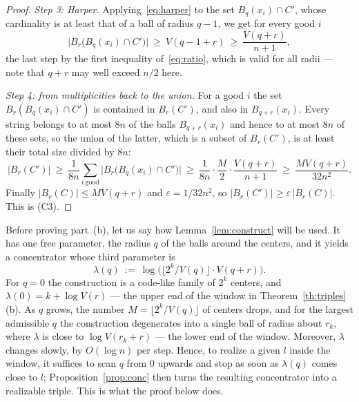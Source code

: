 \documentclass[11pt,a4paper]{article}
\theoremstyle{definition}
\newcommand{\eps}{\varepsilon}
\renewcommand{\le}{\leqslant}
\renewcommand{\ge}{\geqslant}
\begin{document}
\begin{proof}
\emph{Step 3: Harper.} Applying~\eqref{eq:harper} to the set
$B_q(x_i)\cap C'$, whose cardinality is at least that of a ball of radius
$q-1$, we get for every good $i$
\[
  \bigl|B_r\bigl(B_q(x_i)\cap C'\bigr)\bigr|\ \ge\ V(q-1+r)\ \ge\
  \frac{V(q+r)}{n+1},
\]
the last step by the first inequality of~\eqref{eq:ratio}, which is valid for
all radii --- note that $q+r$ may well exceed $n/2$ here.

\emph{Step 4: from multiplicities back to the union.} For a good $i$ the set
$B_r(B_q(x_i)\cap C')$ is contained in $B_r(C')$, and also in $B_{q+r}(x_i)$.
Every string belongs to at most $8n$ of the balls $B_{q+r}(x_i)$ and hence to
at most $8n$ of these sets, so the union of the latter, which is a subset of
$B_r(C')$, is at least their total size divided by $8n$:
\[
  |B_r(C')|\ \ge\ \frac1{8n}\sum_{i\ \text{good}}
  \bigl|B_r\bigl(B_q(x_i)\cap C'\bigr)\bigr|\ \ge\
  \frac1{8n}\cdot\frac M2\cdot\frac{V(q+r)}{n+1}\ \ge\
  \frac{MV(q+r)}{32n^2} .
\]
Finally $|B_r(C)|\le MV(q+r)$ and $\eps=1/32n^2$, so
$|B_r(C')|\ge\eps\,|B_r(C)|$. This is (C3). 
\end{proof}

Before proving part~(b), let us say how Lemma~\ref{lem:construct} will be
used. It has one free parameter, the radius $q$ of the balls around the
centers, and it yields a concentrator whose third parameter is
\[
  \lambda(q)\ :=\ \log\bigl(\lfloor2^k/V(q)\rfloor\cdot V(q+r)\bigr) .
\]
For $q=0$ the construction is a code-like family of $2^k$ centers, and
$\lambda(0)=k+\log V(r)$ --- the upper end of the window in
Theorem~\ref{th:triples}(b). As $q$ grows, the number
$M=\lfloor2^k/V(q)\rfloor$ of centers drops, and for the largest admissible
$q$ the construction degenerates into a single ball of radius about $r_k$,
where $\lambda$ is close to $\log V(r_k+r)$ --- the lower end of the window.
Moreover, $\lambda$ changes slowly, by $O(\log n)$ per step. Hence, to realize
a given $l$ inside the window, it suffices to scan $q$ from $0$ upwards and
stop as soon as $\lambda(q)$ comes close to $l$; Proposition~\ref{prop:conc}
then turns the resulting concentrator into a realizable triple. This is what
the proof below does.
\end{document}
